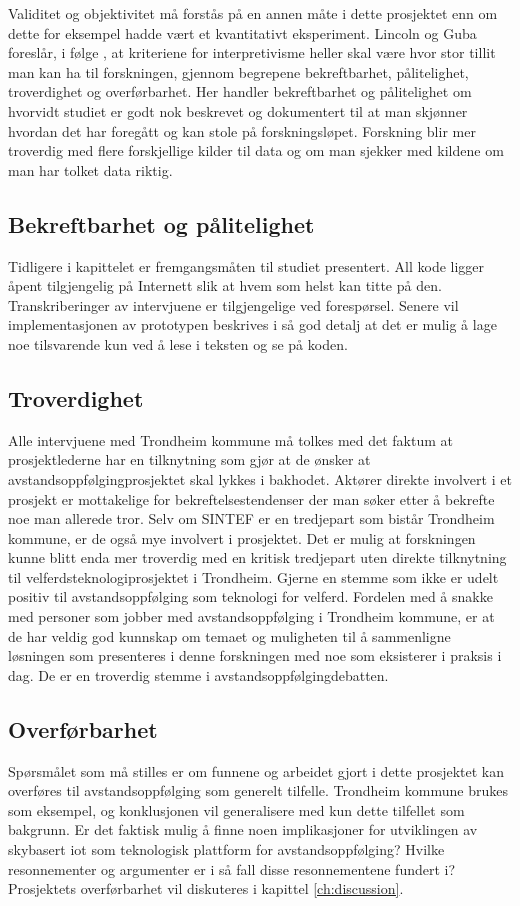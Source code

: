 Validitet og objektivitet må forstås på en annen måte i dette prosjektet enn om dette for eksempel hadde vært et
kvantitativt eksperiment. Lincoln og Guba foreslår, i følge \citet{oates},
at kriteriene for interpretivisme
heller skal være hvor stor tillit man kan ha til forskningen, gjennom begrepene bekreftbarhet, pålitelighet, troverdighet og overførbarhet.
Her handler bekreftbarhet og pålitelighet om hvorvidt studiet er godt nok beskrevet og dokumentert til at man skjønner hvordan det har
foregått og kan stole
på forskningsløpet. Forskning blir mer troverdig med flere forskjellige kilder til data og om man sjekker med kildene om man har
tolket data riktig.

\subsection{Bekreftbarhet og pålitelighet}
Tidligere i kapittelet er fremgangsmåten til studiet presentert. All kode ligger åpent tilgjengelig på Internett slik at hvem som helst kan
titte på den. Transkriberinger av intervjuene er tilgjengelige ved forespørsel. Senere vil implementasjonen av prototypen beskrives i
så god detalj at det er mulig å lage noe tilsvarende kun ved å lese i teksten og se på koden.

\subsection{Troverdighet}
Alle intervjuene med Trondheim kommune må tolkes med det faktum at prosjektlederne har en tilknytning som
gjør at de ønsker at avstandsoppfølgingprosjektet
skal lykkes i bakhodet. Aktører direkte involvert i et prosjekt er mottakelige for bekreftelsestendenser der man søker etter å bekrefte noe
man allerede tror. Selv om SINTEF er en tredjepart som bistår Trondheim kommune, er de også mye involvert i prosjektet.
Det er mulig at forskningen kunne blitt enda mer troverdig med en kritisk tredjepart uten direkte tilknytning til velferdsteknologiprosjektet i Trondheim.
Gjerne en stemme som ikke er udelt positiv til avstandsoppfølging som teknologi for velferd.
Fordelen med å snakke med personer som jobber med avstandsoppfølging i Trondheim kommune, er at de har veldig god kunnskap om temaet
og muligheten til å sammenligne løsningen som presenteres i denne forskningen med noe som eksisterer i praksis i dag.
De er en troverdig stemme i avstandsoppfølgingdebatten.

\subsection{Overførbarhet}
Spørsmålet som må stilles er om funnene og arbeidet gjort i dette prosjektet kan overføres til avstandsoppfølging som generelt tilfelle.
Trondheim kommune brukes som eksempel, og konklusjonen vil generalisere med kun dette tilfellet som bakgrunn.
Er det faktisk mulig å finne noen implikasjoner for utviklingen av skybasert \gls{iot} som teknologisk plattform for avstandsoppfølging?
Hvilke resonnementer og argumenter er i så fall disse resonnementene fundert i? Prosjektets overførbarhet vil diskuteres i
kapittel \ref{ch:discussion}.

